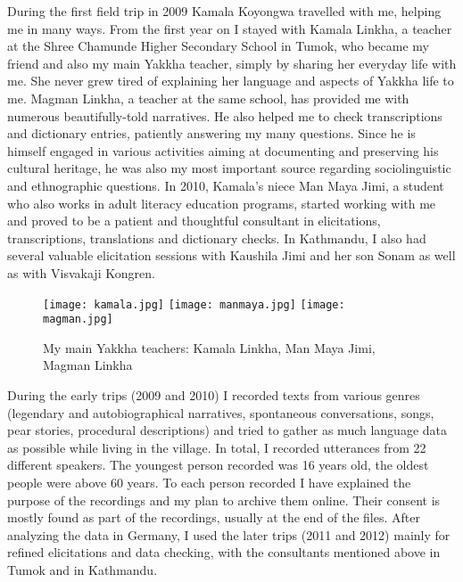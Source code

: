 During the first field trip in 2009 Kamala Koyongwa travelled with me, helping me in many ways. From the first year on I stayed with Kamala Linkha, a teacher at the Shree Chamunde Higher Secondary School in Tumok, who became my friend and also my main Yakkha teacher, simply by sharing her everyday life with me. She  never grew tired of explaining her language and aspects of Yakkha life to me.  Magman Linkha, a teacher at the same school, has provided me with numerous beautifully-told narratives. He also  helped me to check transcriptions and dictionary entries, patiently answering my many questions. Since he is himself engaged in various activities aiming at documenting and preserving his cultural heritage, he was also my most important source regarding socio\-linguistic and ethnographic questions. In 2010, Kamala's niece Man Maya Jimi, a student who also works in adult literacy education programs, started working with me and proved to be a patient and thoughtful consultant in elicitations, transcriptions, translations and dictionary checks. In Kathmandu, I also had several valuable elicitation sessions with Kaushila Jimi and her son Sonam as well as with Visvakaji Kongren.


 \begin{figure}
 \texttt{[image: kamala.jpg]}
 \hfill
 \texttt{[image: manmaya.jpg]}
 \hfill
 \texttt{[image: magman.jpg]}
 \caption{My main Yakkha teachers: Kamala Linkha, Man Maya Jimi, Magman Linkha}
 \end{figure}

 
During the early trips (2009 and 2010) I recorded texts from various genres (legendary and autobiographical narratives, spontaneous conversations, songs, pear stories, procedural descriptions) and tried to gather as much language data as possible while living in the village. In total, I recorded utterances from 22 different speakers. The youngest person recorded was 16 years old, the oldest people were above 60 years. To each person recorded I have explained the purpose of the recordings and my plan to archive them online. Their consent is mostly found as part of the recordings, usually at the end of the files.  After analyzing the data in Germany, I used the later trips (2011 and 2012) mainly for refined elicitations and data checking, with the consultants mentioned above in Tumok and in Kathmandu. 

